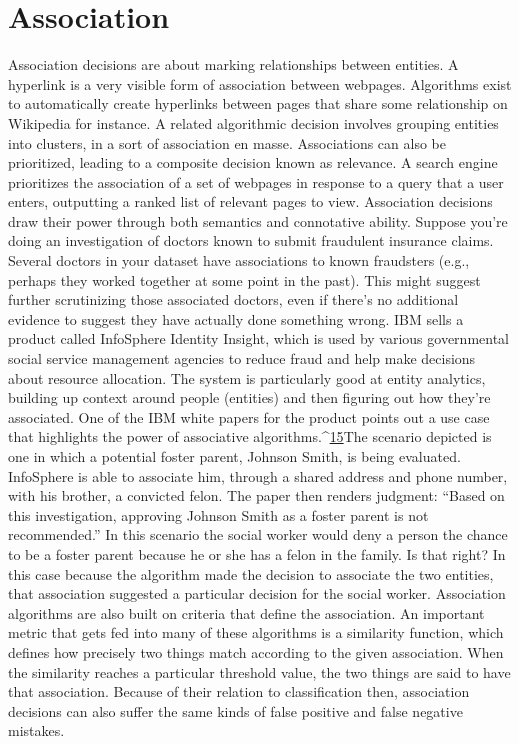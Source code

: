 \section{Association} 
Association decisions are about marking relationships between entities. A hyperlink is a very visible form of association between webpages. Algorithms exist to automatically create hyperlinks between pages that share some relationship on Wikipedia for instance. A related algorithmic decision involves grouping entities into clusters, in a sort of association en masse. Associations can also be prioritized, leading to a composite decision known as relevance. A search engine prioritizes the association of a set of webpages in response to a query that a user enters, outputting a ranked list of relevant pages to view. 
Association decisions draw their power through both semantics and connotative ability. Suppose you're doing an investigation of doctors known to submit fraudulent insurance claims. Several doctors in your dataset have associations to known fraudsters (e.g., perhaps they worked together at some point in the past). This might suggest further scrutinizing those associated doctors, even if there's no additional evidence to suggest they have actually done something wrong.
IBM sells a product called InfoSphere Identity Insight, which is used by various governmental social service management agencies to reduce fraud and help make decisions about resource allocation. The system is particularly good at entity analytics, building up context around people (entities) and then figuring out how they're associated. One of the IBM white papers for the product points out a use case that highlights the power of associative algorithms.^{\href{#endnotes}{15}}The scenario depicted is one in which a potential foster parent, Johnson Smith, is being evaluated. InfoSphere is able to associate him, through a shared address and phone number, with his brother, a convicted felon. The paper then renders judgment: ``Based on this investigation, approving Johnson Smith as a foster parent is not recommended.'' In this scenario the social worker would deny a person the chance to be a foster parent because he or she has a felon in the family. Is that right? In this case because the algorithm made the decision to associate the two entities, that association suggested a particular decision for the social worker. 
Association algorithms are also built on criteria that define the association. An important metric that gets fed into many of these algorithms is a similarity function, which defines how precisely two things match according to the given association. When the similarity reaches a particular threshold value, the two things are said to have that association. Because of their relation to classification then, association decisions can also suffer the same kinds of false positive and false negative mistakes. 

